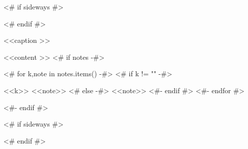 \begin{<< env  >>}
  \centering
  <# if sideways #>
  \begin{adjustbox}{angle=90}
  <# endif #>
  \begin{threeparttable}
    \caption{<<caption >>}
    <<content >>
    <# if notes -#>
    \begin{tablenotes}
      <# for k,note in notes.items() -#>
      <# if k != "" -#>
      \item [<<k>>] <<note>>
      <# else -#>
      <<note>>
      <#- endif #>
      <#- endfor #>
    \end{tablenotes}
    <#- endif #>
  \end{threeparttable}
  <# if sideways #>
  \end{adjustbox}
  <# endif #>
  \label{tbl:<< id >>}
\end{<< env  >>}
